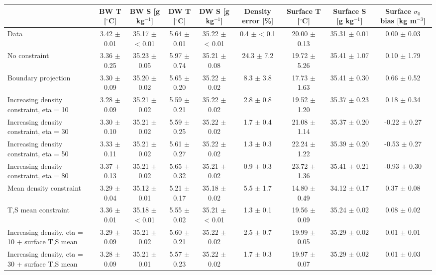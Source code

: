 \begin{tabular}{lcccccccc}
\toprule
 & BW T [$^\circ$C] & BW S [g kg$^{-1}$] & DW T [$^\circ$C] & DW S [g kg$^{-1}$] & Density error [\%] & Surface T [$^\circ$C] & Surface S [g kg$^{-1}$] & Surface $\sigma_0$ bias [kg m$^{-3}$] \\
\midrule
Data & 3.42 $\pm$ 0.01 & 35.17 $\pm$ < 0.01 & 5.64 $\pm$ 0.01 & 35.22 $\pm$ < 0.01 & 0.4 $\pm$ < 0.1 & 20.00 $\pm$ 0.13 & 35.31 $\pm$ 0.01 & 0.00 $\pm$ 0.03 \\
No constraint & 3.36 $\pm$ 0.25 & 35.23 $\pm$ 0.05 & 5.97 $\pm$ 0.74 & 35.21 $\pm$ 0.08 & 24.3 $\pm$ 7.2 & 19.72 $\pm$ 5.26 & 35.41 $\pm$ 1.07 & 0.10 $\pm$ 1.79 \\
Boundary projection & 3.30 $\pm$ 0.09 & 35.20 $\pm$ 0.02 & 5.65 $\pm$ 0.20 & 35.22 $\pm$ 0.02 & 8.3 $\pm$ 3.8 & 17.73 $\pm$ 1.63 & 35.41 $\pm$ 0.30 & 0.66 $\pm$ 0.52 \\
Increasing density constraint, eta = 10 & 3.28 $\pm$ 0.09 & 35.21 $\pm$ 0.02 & 5.59 $\pm$ 0.21 & 35.22 $\pm$ 0.02 & 2.8 $\pm$ 0.8 & 19.52 $\pm$ 1.20 & 35.37 $\pm$ 0.23 & 0.18 $\pm$ 0.34 \\
Increasing density constraint, eta = 30 & 3.30 $\pm$ 0.10 & 35.21 $\pm$ 0.02 & 5.59 $\pm$ 0.25 & 35.22 $\pm$ 0.02 & 1.7 $\pm$ 0.4 & 21.08 $\pm$ 1.14 & 35.37 $\pm$ 0.20 & -0.22 $\pm$ 0.27 \\
Increasing density constraint, eta = 50 & 3.33 $\pm$ 0.11 & 35.21 $\pm$ 0.02 & 5.61 $\pm$ 0.27 & 35.22 $\pm$ 0.02 & 1.3 $\pm$ 0.3 & 22.24 $\pm$ 1.22 & 35.39 $\pm$ 0.20 & -0.53 $\pm$ 0.27 \\
Increasing density constraint, eta = 80 & 3.37 $\pm$ 0.13 & 35.21 $\pm$ 0.02 & 5.65 $\pm$ 0.32 & 35.21 $\pm$ 0.02 & 0.9 $\pm$ 0.3 & 23.72 $\pm$ 1.36 & 35.41 $\pm$ 0.21 & -0.93 $\pm$ 0.30 \\
Mean density constraint & 3.29 $\pm$ 0.04 & 35.12 $\pm$ 0.01 & 5.21 $\pm$ 0.17 & 35.18 $\pm$ 0.02 & 5.5 $\pm$ 1.7 & 14.80 $\pm$ 0.49 & 34.12 $\pm$ 0.17 & 0.37 $\pm$ 0.08 \\
T,S mean constraint & 3.36 $\pm$ 0.01 & 35.18 $\pm$ < 0.01 & 5.55 $\pm$ 0.02 & 35.21 $\pm$ < 0.01 & 1.3 $\pm$ 0.1 & 19.56 $\pm$ 0.09 & 35.24 $\pm$ 0.02 & 0.08 $\pm$ 0.02 \\
Increasing density, eta = 10 + surface T,S mean & 3.29 $\pm$ 0.09 & 35.21 $\pm$ 0.02 & 5.60 $\pm$ 0.21 & 35.22 $\pm$ 0.02 & 2.5 $\pm$ 0.7 & 19.99 $\pm$ 0.05 & 35.29 $\pm$ 0.02 & 0.01 $\pm$ 0.01 \\
Increasing density, eta = 30 + surface T,S mean & 3.28 $\pm$ 0.09 & 35.21 $\pm$ 0.01 & 5.57 $\pm$ 0.23 & 35.22 $\pm$ 0.02 & 1.7 $\pm$ 0.3 & 19.97 $\pm$ 0.07 & 35.29 $\pm$ 0.02 & 0.01 $\pm$ 0.03 \\

\end{tabular}
